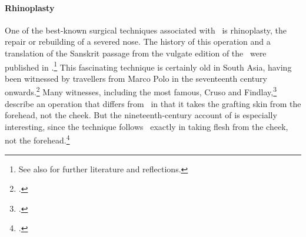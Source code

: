 

\paragraph{Rhinoplasty}
\label{sec:rhinoplasty}

One of the best-known surgical techniques associated with \SS\ is rhinoplasty, the repair or rebuilding of a severed nose. The history of this operation and a translation of the Sanskrit passage from
the vulgate edition of the \SS\ were published in \citet[67--70, 
99--100]{wuja-2003}.\footnote{See
also \cite[IB, 327--328, note 186]{meul-hist} for further literature and
reflections.}  This fascinating technique is certainly old in South Asia, having
been witnessed by travellers from Marco Polo in the seventeenth century
onwards.\footcite[ii.301]{manu-stor} Many witnesses, including the most famous,
Cruso and Findlay,\footcite[883, 891\,f.]{cowasjee} describe an operation that
differs from \SS\ in that it takes the grafting skin from the
forehead, not the cheek.  But the nineteenth-century account of
\citeauthor{thor-bann} is especially interesting, since the technique follows
\SS\ exactly in taking flesh from the cheek, not the
forehead.\footcite[352--3]{thor-bann}

